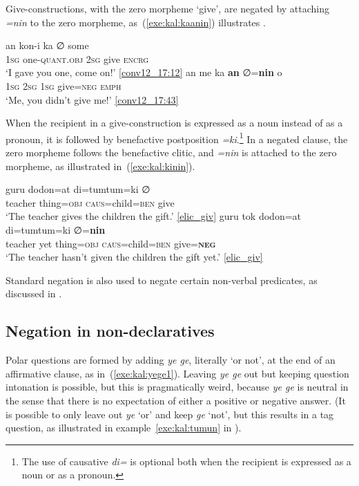 \documentclass[output=paper,colorlinks,citecolor=brown,draft]{langscibook}
\begin{document}
Give-constructions, with the zero morpheme `give', are negated by attaching \textit{=nin} to the zero morpheme, as~(\ref{exe:kal:kaanin}) illustrates \citep[288]{Visser2022}.

\ea \label{exe:kal:kaanin}
\ea \gll an kon-i ka ∅ some\\
\textsc{1sg} one-\textsc{quant.obj} \textsc{2sg} give \textsc{encrg}\\
\glt `I gave you one, come on!' {\href{http://hdl.handle.net/10050/00-0000-0000-0004-1BBD-5}{[conv12\_17:12]}}
\ex \gll 	an me ka \textbf{an} ∅=\textbf{nin} o\\
\textsc{1sg} {\glme} \textsc{2sg} \textsc{1sg} give=\textsc{neg} \textsc{emph}\\
\glt `Me, you didn't give me!' {\href{http://hdl.handle.net/10050/00-0000-0000-0004-1BBD-5}{[conv12\_17:43]}}
\z \z

When the recipient in a give-construction is expressed as a noun instead of as a pronoun, it is followed by benefactive postposition \textit{=ki}.\footnote{The use of causative \textit{di=} is optional both when the recipient is expressed as a noun or as a pronoun.} In a negated clause, the zero morpheme follows the benefactive clitic, and \textit{=nin} is attached to the zero morpheme, as illustrated in~(\ref{exe:kal:kinin}).

\ea	\label{exe:kal:kinin}
\ea \gll guru dodon=at di=tumtum=ki ∅\\
	teacher thing=\textsc{obj} \textsc{caus}=child=\textsc{ben} give\\
	\glt 	`The teacher gives the children the gift.' {\href{http://hdl.handle.net/10050/00-0000-0000-0004-1C60-A}{[elic\_giv]}}
\ex \gll guru 		tok 		dodon=at 	di=tumtum=ki ∅=\textbf{nin}\\
	teacher yet thing=\textsc{obj} \textsc{caus}=child=\textsc{ben} give=\textbf{\textsc{neg}}\\
	\glt 	`The teacher hasn't given the children the gift yet.' {\href{http://hdl.handle.net/10050/00-0000-0000-0004-1C60-A}{[elic\_giv]}}
\z \z

Standard negation is also used to negate certain non-verbal predicates, as discussed in .                                            

\subsection{Negation in non-declaratives}
\label{sec:negnondecl}
Polar questions are formed by adding \textit{ye ge}, literally `or not', at the end of an affirmative clause, as in~(\ref{exe:kal:yege1}). Leaving \textit{ye ge} out but keeping question intonation is possible, but this is pragmatically weird, because \textit{ye ge} is neutral in the sense that there is no expectation of either a positive or negative answer. (It is possible to only leave out \textit{ye} `or' and keep \textit{ge} `not', but this results in a tag question, as illustrated in example~\ref{exe:kal:tumun} in ).
\end{document}

